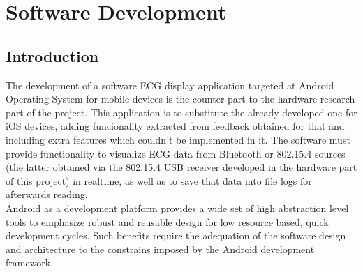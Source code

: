 \chapter{Software Development} %
\label{ch:swdev}

	\section{Introduction}
	\label{sec:sw-intro}

	The development of a software ECG display application targeted at Android Operating System for mobile devices is the counter-part to the hardware research part of the project.
	This application is to substitute the already developed one for iOS devices, adding funcionality extracted from feedback obtained for that and including extra features which couldn't be implemented in it. The software must provide functionality to visualize ECG data from Bluetooth or 802.15.4 sources (the latter obtained via the 802.15.4 USB receiver developed in the hardware part of this project) in realtime, as well as to save that data into file logs for afterwards reading.\\

	Android as a development platform provides a wide set of high abstraction level tools to emphasize robust and reusable design for low resource based, quick development cycles. Such benefits require the adequation of the software design and architecture to the constrains imposed by the Android development framework.\\

